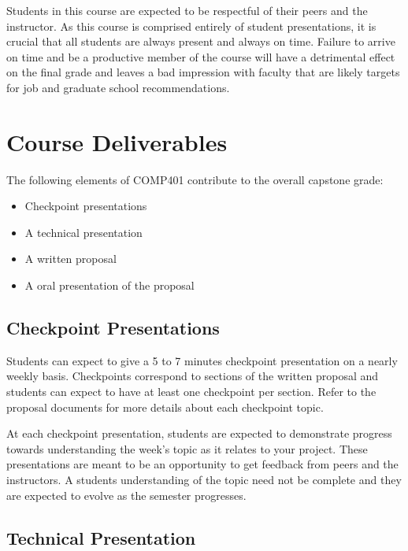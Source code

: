 \documentclass[10pt]{article}
\begin{document}
Students in this course are expected to be respectful of their peers and the instructor. As this course is comprised entirely of student presentations, it is crucial that all students are always present and always on time.  Failure to arrive on time and be a productive member of the course will have a detrimental effect on the final grade and leaves a bad impression with faculty that are likely targets for job and graduate school recommendations.

\section{Course Deliverables}

The following elements of COMP401 contribute to the overall capstone grade:
\begin{itemize}
\item Checkpoint presentations
\item A technical presentation
\item A written proposal
\item A oral presentation of the proposal
\end{itemize}


\subsection{Checkpoint Presentations}

Students can expect to give a 5 to 7 minutes checkpoint presentation on a nearly weekly basis. Checkpoints correspond to sections of the written proposal and students can expect to have at least one checkpoint per section. Refer to the proposal documents for more details about each checkpoint topic.

At each checkpoint presentation, students are expected to demonstrate progress towards understanding the week's topic as it relates to your project.  These presentations are meant to be an opportunity to get feedback from peers and the instructors.  A students understanding of the topic need not be complete and they are expected to evolve as the semester progresses.

\subsection{Technical Presentation}
\end{document}
